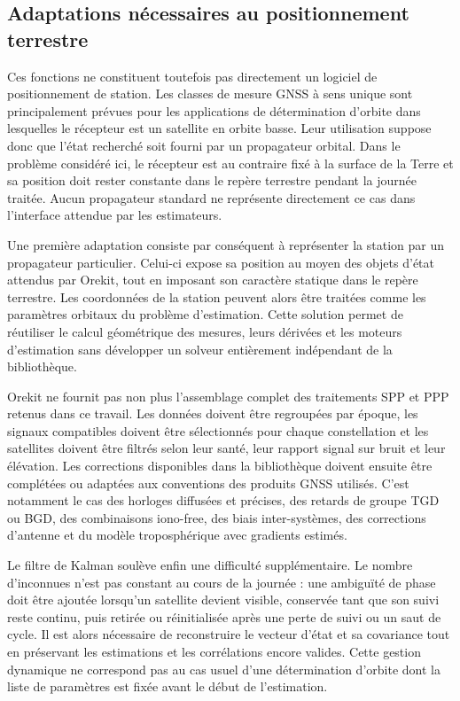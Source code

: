 \subsection{Adaptations nécessaires au positionnement terrestre}

Ces fonctions ne constituent toutefois pas directement un logiciel de
positionnement de station. Les classes de mesure GNSS à sens unique sont
principalement prévues pour les applications de détermination d'orbite dans
lesquelles le récepteur est un satellite en orbite basse. Leur utilisation
suppose donc que l'état recherché soit fourni par un propagateur orbital. Dans
le problème considéré ici, le récepteur est au contraire fixé à la surface de
la Terre et sa position doit rester constante dans le repère terrestre pendant
la journée traitée. Aucun propagateur standard ne représente directement ce
cas dans l'interface attendue par les estimateurs.

Une première adaptation consiste par conséquent à représenter la station par
un propagateur particulier. Celui-ci expose sa position au moyen des objets
d'état attendus par Orekit, tout en imposant son caractère statique dans le
repère terrestre. Les coordonnées de la station peuvent alors être traitées
comme les paramètres orbitaux du problème d'estimation. Cette solution permet
de réutiliser le calcul géométrique des mesures, leurs dérivées et les moteurs
d'estimation sans développer un solveur entièrement indépendant de la
bibliothèque.

Orekit ne fournit pas non plus l'assemblage complet des traitements SPP et PPP
retenus dans ce travail. Les données doivent être regroupées par époque, les
signaux compatibles doivent être sélectionnés pour chaque constellation et les
satellites doivent être filtrés selon leur santé, leur rapport signal sur bruit
et leur élévation. Les corrections disponibles dans la bibliothèque doivent
ensuite être complétées ou adaptées aux conventions des produits GNSS
utilisés. C'est notamment le cas des horloges diffusées et précises, des
retards de groupe TGD ou BGD, des combinaisons iono-free, des biais
inter-systèmes, des corrections d'antenne et du modèle troposphérique avec
gradients estimés.

Le filtre de Kalman soulève enfin une difficulté supplémentaire. Le nombre
d'inconnues n'est pas constant au cours de la journée : une ambiguïté de phase
doit être ajoutée lorsqu'un satellite devient visible, conservée tant que son
suivi reste continu, puis retirée ou réinitialisée après une perte de suivi ou
un saut de cycle. Il est alors nécessaire de reconstruire le vecteur d'état et
sa covariance tout en préservant les estimations et les corrélations encore
valides. Cette gestion dynamique ne correspond pas au cas usuel d'une
détermination d'orbite dont la liste de paramètres est fixée avant le début de
l'estimation.

